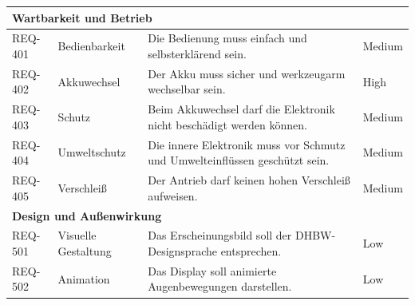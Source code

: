 \begin{longtable}{|p{1.7cm}|p{4.2cm}|p{8.8cm}|p{1.9cm}|}
	\multicolumn{4}{|l|}{\textbf{Wartbarkeit und Betrieb}} \\
	\hline
	REQ-401 & Bedienbarkeit & Die Bedienung muss einfach und selbsterklärend sein. & Medium \\
	\hline
	REQ-402 & Akkuwechsel & Der Akku muss sicher und werkzeugarm wechselbar sein. & High \\
	\hline
	REQ-403 & Schutz & Beim Akkuwechsel darf die Elektronik nicht beschädigt werden können. & Medium \\
	\hline
	REQ-404 & Umweltschutz & Die innere Elektronik muss vor Schmutz und Umwelteinflüssen geschützt sein. & Medium \\
	\hline
	REQ-405 & Verschleiß & Der Antrieb darf keinen hohen Verschleiß aufweisen. & Medium \\
	\hline
	
	\multicolumn{4}{|l|}{\textbf{Design und Außenwirkung}} \\
	\hline
	REQ-501 & Visuelle Gestaltung & Das Erscheinungsbild soll der DHBW-Designsprache entsprechen. & Low \\
	\hline
	REQ-502 & Animation & Das Display soll animierte Augenbewegungen darstellen. & Low \\
	\hline
	
\end{longtable}
